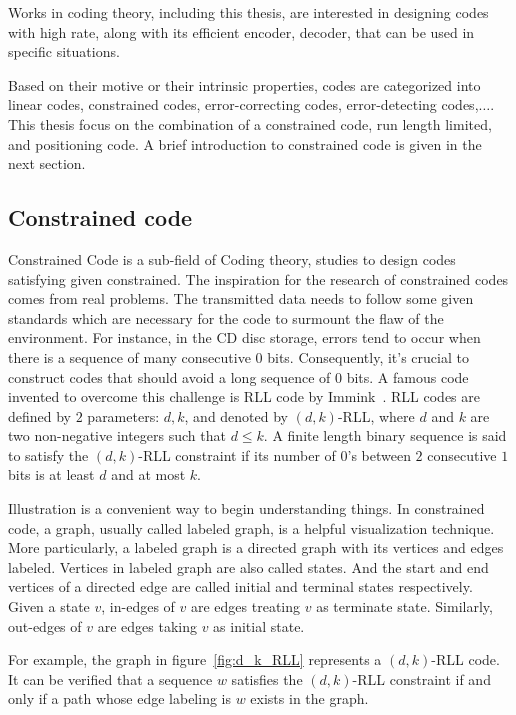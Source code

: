 Works in coding theory, including this thesis, are interested in designing codes with high rate, along with its efficient encoder, decoder, that can be used in specific situations. 

Based on their motive or their intrinsic properties, codes are categorized into linear codes, constrained codes, error-correcting codes, error-detecting codes,$\ldots$. This thesis focus on the combination of a constrained code, run length limited, and positioning code. A brief introduction to constrained code is given in the next section.

\subsection{Constrained code}\label{subsec:constrained_code}
Constrained Code is a sub-field of Coding theory, studies to design codes satisfying given constrained. The inspiration for the research of constrained codes comes from real problems. The transmitted data needs to follow some given standards which are necessary for the code to surmount the flaw of the environment. For instance, in the CD disc storage, errors tend to occur when there is a sequence of many consecutive $0$ bits. Consequently, it's crucial to construct codes that should avoid a long sequence of $0$ bits. A famous code invented to overcome this challenge is \gls{RLL} code by Immink~\cite{immink1990runlength}. \gls{RLL} codes are defined by $2$ parameters: $d, k$, and denoted by $(d,k)$-RLL, where $d$ and $k$ are two non-negative integers such that $d\leq k$. A finite length binary sequence 
is said to satisfy the $(d,k)$-RLL constraint if its number of $0$'s between $2$ consecutive $1$ bits is at least $d$ and at most $k$.

Illustration is a convenient way to begin understanding things. In constrained code, a graph, usually called labeled graph, is a helpful visualization technique. More particularly, a labeled graph is a directed graph with its vertices and edges labeled. Vertices in labeled graph are also called states. And the start and end vertices of a directed edge are called initial and terminal states respectively. Given a state $v$, in-edges of $v$ are edges treating $v$ as terminate state. Similarly, out-edges of $v$ are edges taking $v$ as initial state. 

For example, the graph in figure~\ref{fig:d_k_RLL} represents a $(d,k)$-RLL code. It can be verified that a sequence $w$ satisfies the $(d,k)$-RLL constraint if and only if a path whose edge labeling is $w$ exists in the graph.

